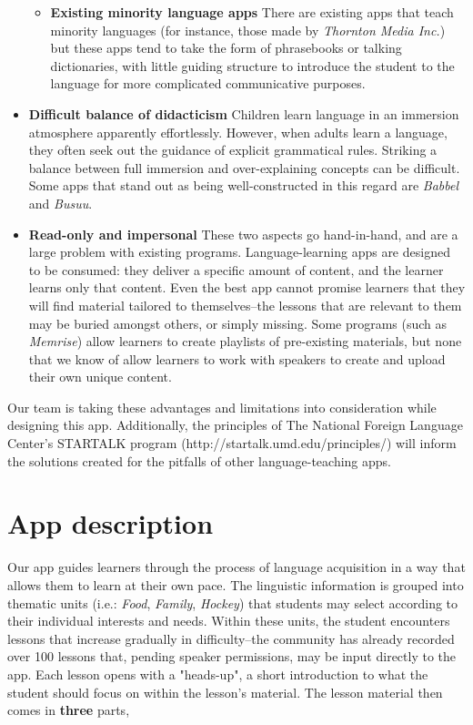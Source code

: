 \documentclass[12pt]{article} %
\begin{document}
\begin{itemize}
\begin{itemize}
	\item {\bf Existing minority language apps} There are existing apps that teach minority languages (for instance, those made by {\it Thornton Media Inc.}) but these apps tend to take the form of phrasebooks or talking dictionaries, with little guiding structure to introduce the student to the language for more complicated communicative purposes.

	\end{itemize}

\item {\bf Difficult balance of didacticism} Children learn language in an immersion atmosphere apparently effortlessly. However, when adults learn a language, they often seek out the guidance of explicit grammatical rules. Striking a balance between full immersion and over-explaining concepts can be difficult. Some apps that stand out as being well-constructed in this regard are {\it Babbel} and {\it Busuu}.

\item {\bf Read-only and impersonal} These two aspects go hand-in-hand, and are a large problem with existing programs. Language-learning apps are designed to be consumed: they deliver a specific amount of content, and the learner learns only that content. Even the best app cannot promise learners that they will find material tailored to themselves--the lessons that are relevant to them may be buried amongst others, or simply missing. Some programs (such as {\it Memrise}) allow learners to create playlists of pre-existing materials, but none that we know of allow learners to work with speakers to create and upload their own unique content.

\end{itemize}

Our team is taking these advantages and limitations into consideration while designing this app. Additionally, the principles of The National Foreign Language Center's STARTALK program (http://startalk.umd.edu/principles/) will inform the solutions created for the pitfalls of other language-teaching apps.


\section{App description}

Our app guides learners through the process of language acquisition in a way that allows them to learn at their own pace. The linguistic information is grouped into thematic units (i.e.: {\it Food}, {\it Family}, {\it Hockey}) that students may select according to their individual interests and needs. Within these units, the student encounters lessons that increase gradually in difficulty--the community has already recorded over 100 lessons that, pending speaker permissions, may be input directly to the app. Each lesson opens with a "heads-up", a short introduction to what the student should focus on within the lesson's material. The lesson material then comes in {\bf three} parts, 
\end{document}
